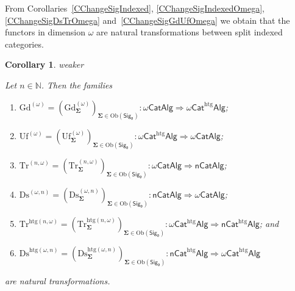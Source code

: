 \documentclass[a4paper, reqno]{amsbook}
\makeatletter
\newcommand{\sig}[1]{\mathbf{#1}}             %
\newcommand{\htg}{\mathrm{htg}}                %
\newcommand{\Gd}{\mathrm{Gd}}
\newcommand{\Uf}{\mathrm{Uf}}
\newcommand{\Ds}{\mathrm{Ds}}
\newcommand{\Tr}{\mathrm{Tr}}
\theoremstyle{plain}
\newtheorem{corollary}[theorem]{Corollary}
\theoremstyle{definition}
\newcommand*{\CA@leanpending}{}
\newcommand*{\CA@leanrelation}{}
\newcommand*{\lean}[2]{%
  \ifcsname\string\color@lean@#1\endcsname\else
    \PackageError{main}{Unknown relation `#1' in \string\lean}{Use equivalent, weaker or stronger.}%
  \fi
  \gdef\CA@leanrelation{#1}%
  \gdef\CA@leanpending{#2}}
\makeatother
\begin{document}
From Corollaries~\ref{CChangeSigIndexed}, \ref{CChangeSigIndexedOmega}, \ref{CChangeSigDsTrOmega} and~\ref{CChangeSigGdUfOmega} we obtain that the functors in dimension $\omega$ are natural transformations between split indexed categories.

\begin{corollary}\label{CChangeSigNatOmega}\lean{weaker}{ChangeOfSignature.omegaGraduationIndexed,ChangeOfSignature.omegaUnificationIndexed,ChangeOfSignature.homogeneousOmegaTruncationNaturality,ChangeOfSignature.homogeneousOmegaDiscretizationNaturality,ChangeOfSignature.heterogeneousOmegaTruncationNaturality,ChangeOfSignature.heterogeneousOmegaDiscretizationNaturality}
Let $n\in\mathbb{N}$.
Then the families
\begin{enumerate}
	\item
	$\Gd^{(\omega)}=(\Gd^{(\omega)}_{\sig{\Sigma}})_{\sig{\Sigma}\in\mathrm{Ob}(\mathsf{Sig}_{\mathfrak{d}})}\colon\omega\mathsf{CatAlg}\Longrightarrow\omega\mathsf{Cat}^{\htg}\mathsf{Alg}$;

	\item
	$\Uf^{(\omega)}=(\Uf^{(\omega)}_{\sig{\Sigma}})_{\sig{\Sigma}\in\mathrm{Ob}(\mathsf{Sig}_{\mathfrak{d}})}\colon\omega\mathsf{Cat}^{\htg}\mathsf{Alg}\Longrightarrow\omega\mathsf{CatAlg}$;

	\item
	$\Tr^{(n,\omega)}=(\Tr^{(n,\omega)}_{\sig{\Sigma}})_{\sig{\Sigma}\in\mathrm{Ob}(\mathsf{Sig}_{\mathfrak{d}})}\colon\omega\mathsf{CatAlg}\Longrightarrow\mathsf{nCatAlg}$;

	\item
	$\Ds^{(\omega,n)}=(\Ds^{(\omega,n)}_{\sig{\Sigma}})_{\sig{\Sigma}\in\mathrm{Ob}(\mathsf{Sig}_{\mathfrak{d}})}\colon\mathsf{nCatAlg}\Longrightarrow\omega\mathsf{CatAlg}$;

	\item
	$\Tr^{\htg(n,\omega)}=(\Tr^{\htg(n,\omega)}_{\sig{\Sigma}})_{\sig{\Sigma}\in\mathrm{Ob}(\mathsf{Sig}_{\mathfrak{d}})}\colon\omega\mathsf{Cat}^{\htg}\mathsf{Alg}\Longrightarrow\mathsf{nCat}^{\htg}\mathsf{Alg}$; and

	\item
	$\Ds^{\htg(\omega,n)}=(\Ds^{\htg(\omega,n)}_{\sig{\Sigma}})_{\sig{\Sigma}\in\mathrm{Ob}(\mathsf{Sig}_{\mathfrak{d}})}\colon\mathsf{nCat}^{\htg}\mathsf{Alg}\Longrightarrow\omega\mathsf{Cat}^{\htg}\mathsf{Alg}$
\end{enumerate}
are natural transformations.
\end{corollary}
\end{document}

